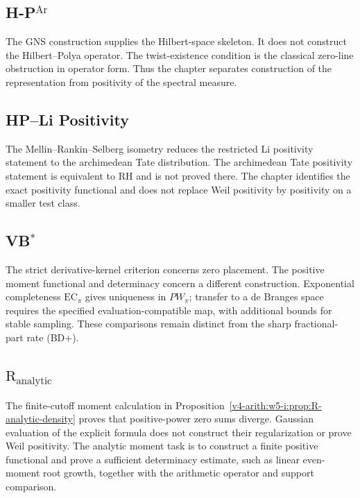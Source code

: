 \subsection{H-P\({}^{\mathrm{Ar}}\)}
\label{v4-arith:w6-j:ch56}

The GNS construction supplies the Hilbert-space skeleton.  It does not
construct the Hilbert--Polya operator.  The twist-existence condition is
the classical zero-line obstruction in operator form.  Thus the chapter
separates construction of the representation from positivity of the
spectral measure.

\subsection{HP--Li Positivity}
\label{v4-arith:w6-j:ch57}

The Mellin--Rankin--Selberg isometry reduces the restricted Li
positivity statement to the archimedean Tate distribution.  The
archimedean Tate positivity statement is equivalent to RH and is not
proved there.  The chapter identifies the exact positivity functional
and does not replace Weil positivity by positivity on a smaller test
class.

\subsection{VB\({}^{*}\)}
\label{v4-arith:w6-j:ch58}

The strict derivative-kernel criterion concerns zero placement.
The positive moment functional and determinacy concern a different
construction. Exponential completeness \(\mathrm{EC}_\pi\) gives
uniqueness in \(PW_\pi\); transfer to a de Branges space requires
the specified evaluation-compatible map, with additional bounds for
stable sampling. These comparisons remain distinct from the sharp
fractional-part rate (BD+).

\subsection{\(\mathrm{R}_{\mathrm{analytic}}\)}
\label{v4-arith:w6-j:ch59}

The finite-cutoff moment calculation in
Proposition~\ref{v4-arith:w5-i:prop:R-analytic-density} proves that
positive-power zero sums diverge. Gaussian evaluation of the explicit
formula does not construct their regularization or prove Weil
positivity. The analytic moment task is to construct a finite positive
functional and prove a sufficient determinacy estimate, such as linear
even-moment root growth, together with the arithmetic operator and
support comparison.

